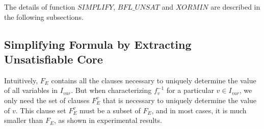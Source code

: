 \documentclass[journal]{IEEEtran}
\begin{document}
\vspace{0.2cm}

%
%
%
%
%

The details of function $SIMPLIFY$, $BFL\_UNSAT$ and $XORMIN$ are described in the following subsections.

\subsection{Simplifying Formula by Extracting Unsatisfiable Core}\label{subsec_sim}
Intuitively,
$F_E$ contains all the clauses necessary to uniquely determine the value of all variables in $I_{var}$.
But when characterizing $f_v^{-1}$ for a particular $v\in I_{var}$,
we only need the set of clauses $F_E^v$ that is necessary to uniquely determine the value of $v$.
This clause set $F_E^v$ must be a subset of $F_E$,
and in most cases,
it is much smaller than $F_E$,
as shown in experimental results.
\end{document}
